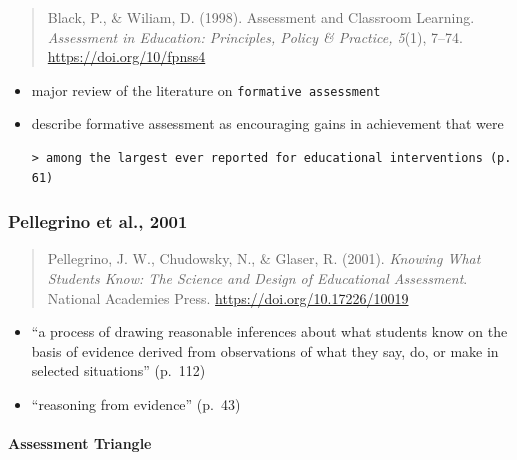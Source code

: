 \documentclass[
]{book}
\providecommand{\tightlist}{%
  \setlength{\itemsep}{0pt}\setlength{\parskip}{0pt}}
\begin{document}
\begin{quote}
Black, P., \& Wiliam, D. (1998). Assessment and Classroom Learning. \emph{Assessment in Education: Principles, Policy \& Practice, 5}(1), 7--74. \url{https://doi.org/10/fpnss4}
\end{quote}

\begin{itemize}
\item
  major review of the literature on \texttt{formative\ assessment}\\
\item
  describe formative assessment as encouraging gains in achievement that were

\begin{verbatim}
> among the largest ever reported for educational interventions (p. 61)
\end{verbatim}
\end{itemize}

\hypertarget{pellegrino-et-al.-2001}{%
\subsubsection*{Pellegrino et al., 2001}\label{pellegrino-et-al.-2001}}

\begin{quote}
Pellegrino, J. W., Chudowsky, N., \& Glaser, R. (2001). \emph{Knowing What Students Know: The Science and Design of Educational Assessment}. National Academies Press. \url{https://doi.org/10.17226/10019}
\end{quote}

\begin{itemize}
\tightlist
\item
  ``a process of drawing reasonable inferences about what students know on the basis of evidence derived from observations of what they say, do, or make in selected situations'' (p.~112)\\
\item
  ``reasoning from evidence'' (p.~43)
\end{itemize}

\hypertarget{assessment-triangle}{%
\paragraph*{Assessment Triangle}\label{assessment-triangle}}
\end{document}
